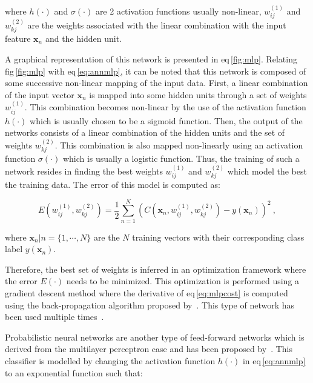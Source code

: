 \noindent where $h(\cdot)$ and $\sigma(\cdot)$ are 2 activation functions usually non-linear, $w_{ij}^{(1)}$ and $ w_{kj}^{(2)}$ are the weights associated with the linear combination with the input feature $\mathbf{x}_n$ and the hidden unit.



A graphical representation of this network is presented in \acs{eq}\,\ref{fig:mlp}.
Relating \acs{fig}\,\ref{fig:mlp} with \acs{eq}\,\eqref{eq:annmlp}, it can be noted that this network is composed of some successive non-linear mapping of the input data.
First, a linear combination of the input vector $\mathbf{x}_n$ is mapped into some hidden units through a set of weights $w_{ij}^{(1)}$.
This combination becomes non-linear by the use of the activation function $h(\cdot)$ which is usually chosen to be a sigmoid function.
Then, the output of the networks consists of a linear combination of the hidden units and the set of weights $w_{kj}^{(2)}$.
This combination is also mapped non-linearly using an activation function $\sigma(\cdot)$ which is usually a logistic function.
Thus, the training of such a network resides in finding the best weights $w_{ij}^{(1)}$ and $ w_{kj}^{(2)}$ which model the best the training data.
The error of this model is computed as:

\begin{equation}
	E(w_{ij}^{(1)},w_{kj}^{(2)}) = \frac{1}{2} \sum_{n=1}^{N} \left( C(\mathbf{x}_n,w_{ij}^{(1)},w_{kj}^{(2)}) - y(\mathbf{x}_n) \right) ^{2} \ ,
	\label{eq:mlpcost}
\end{equation}

\noindent where $\mathbf{x}_n|n=\{1,\cdots,N\}$ are the $N$ training vectors with their corresponding class label $y(\mathbf{x}_n)$.

Therefore, the best set of weights is inferred in an optimization framework where the error $E(\cdot)$ needs to be minimized.
This optimization is performed using a gradient descent method where the derivative of \acs{eq}\,\eqref{eq:mlpcost} is computed using the back-propagation algorithm proposed by~\cite{Rumelhart1988}.
This type of network has been used multiple times~\cite{Matulewicz2013,Parfait2012,trigui2017automatic,trigui2016classification,rampun2016computer}.



Probabilistic neural networks are another type of feed-forward networks which is derived from the multilayer perceptron case and has been proposed by~\cite{Specht1988}.
This classifier is modelled by changing the activation function $h(\cdot)$ in \acs{eq}\,\eqref{eq:annmlp} to an exponential function such that:


